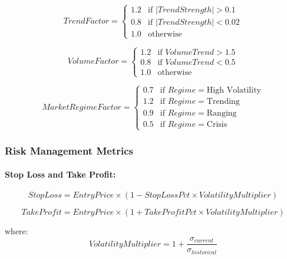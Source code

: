 \documentclass[conference]{IEEEtran}
\begin{document}
\begin{equation}
TrendFactor = \begin{cases}
1.2 & \text{if } |TrendStrength| > 0.1 \\
0.8 & \text{if } |TrendStrength| < 0.02 \\
1.0 & \text{otherwise}
\end{cases}
\end{equation}

\begin{equation}
VolumeFactor = \begin{cases}
1.2 & \text{if } VolumeTrend > 1.5 \\
0.8 & \text{if } VolumeTrend < 0.5 \\
1.0 & \text{otherwise}
\end{cases}
\end{equation}

\begin{equation}
MarketRegimeFactor = \begin{cases}
0.7 & \text{if } Regime = \text{High Volatility} \\
1.2 & \text{if } Regime = \text{Trending} \\
0.9 & \text{if } Regime = \text{Ranging} \\
0.5 & \text{if } Regime = \text{Crisis}
\end{cases}
\end{equation}

\subsubsection{Risk Management Metrics}

\paragraph{Stop Loss and Take Profit:}
\begin{equation}
StopLoss = EntryPrice \times (1 - StopLossPct \times VolatilityMultiplier)
\end{equation}

\begin{equation}
TakeProfit = EntryPrice \times (1 + TakeProfitPct \times VolatilityMultiplier)
\end{equation}

where:
\begin{equation}
VolatilityMultiplier = 1 + \frac{\sigma_{current}}{\sigma_{historical}}
\end{equation}
\end{document}
